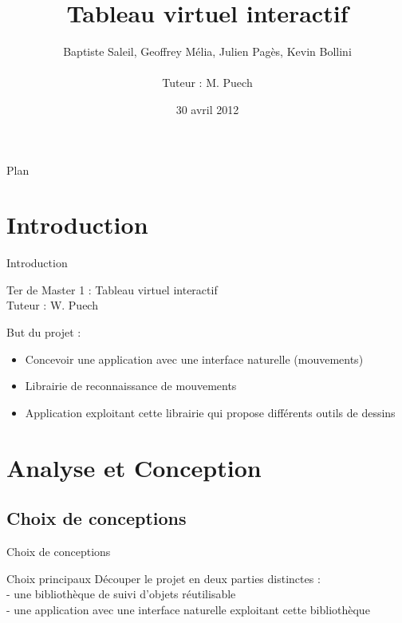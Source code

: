 \documentclass{beamer}
\title{Tableau virtuel interactif}
\author{Baptiste Saleil, Geoffrey Mélia, Julien Pagès, Kevin Bollini \\ \ \\Tuteur : M. Puech}
\date{30 avril 2012}
\begin{document}
	\begin{frame}
		\titlepage
	\end{frame}

	\begin{frame}{Plan}
		\tableofcontents
	\end{frame}

	\section{Introduction}
		\begin{frame}{Introduction}
		\begin{center}
		\LARGE{Ter de Master 1 : Tableau virtuel interactif} \\
		\large{Tuteur : W. Puech}
		\end{center}
		
		But du projet :
		\begin{itemize}
		\item Concevoir une application avec une interface naturelle (mouvements)
		\item Librairie de reconnaissance de mouvements
		\item Application exploitant cette librairie qui propose différents outils de dessins
		\end{itemize}
		
		\end{frame}
		
	\section{Analyse et Conception}
	\subsection{Choix de conceptions}
		\begin{frame}{Choix de conceptions}
			\begin{block}{Choix principaux}
				Découper le projet en deux parties distinctes : \\
				- une bibliothèque de suivi d'objets réutilisable \\
				- une application avec une interface naturelle exploitant cette bibliothèque \\
			\end{block}
		\end{frame}
		
\end{document}
